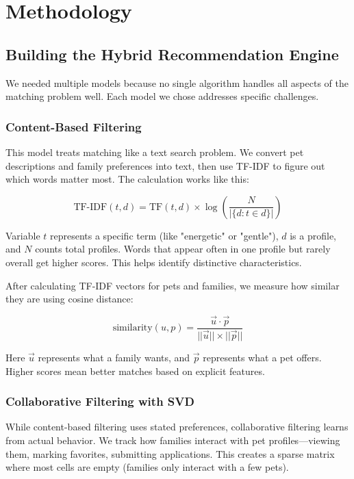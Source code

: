 \documentclass[conference]{IEEEtran}
\begin{document}
\section{Methodology}

\subsection{Building the Hybrid Recommendation Engine}

We needed multiple models because no single algorithm handles all aspects of the matching problem well. Each model we chose addresses specific challenges.

\subsubsection{Content-Based Filtering}
This model treats matching like a text search problem. We convert pet descriptions and family preferences into text, then use TF-IDF to figure out which words matter most. The calculation works like this:

\begin{equation}
\text{TF-IDF}(t,d) = \text{TF}(t,d) \times \log\left(\frac{N}{|\{d : t \in d\}|}\right)
\end{equation}

Variable $t$ represents a specific term (like "energetic" or "gentle"), $d$ is a profile, and $N$ counts total profiles. Words that appear often in one profile but rarely overall get higher scores. This helps identify distinctive characteristics.

After calculating TF-IDF vectors for pets and families, we measure how similar they are using cosine distance:

\begin{equation}
\text{similarity}(u,p) = \frac{\vec{u} \cdot \vec{p}}{||\vec{u}|| \times ||\vec{p}||}
\end{equation}

Here $\vec{u}$ represents what a family wants, and $\vec{p}$ represents what a pet offers. Higher scores mean better matches based on explicit features.

\subsubsection{Collaborative Filtering with SVD}
While content-based filtering uses stated preferences, collaborative filtering learns from actual behavior. We track how families interact with pet profiles—viewing them, marking favorites, submitting applications. This creates a sparse matrix where most cells are empty (families only interact with a few pets).
\end{document}
